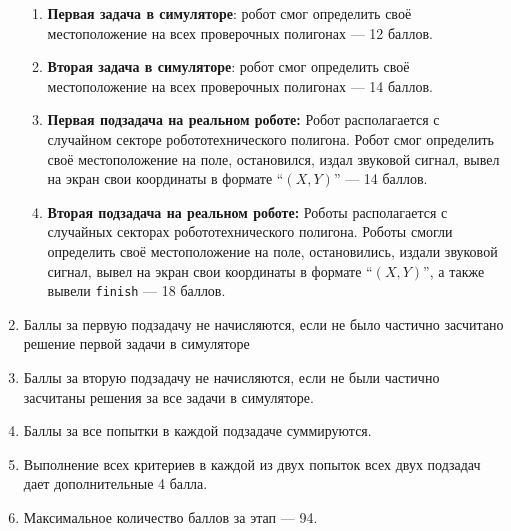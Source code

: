 \begin{enumerate}
        \begin{enumerate}
            \item \textbf{Первая задача в симуляторе}: робот смог определить своё местоположение на всех проверочных полигонах --- 12 баллов.
            \item \textbf{Вторая задача в симуляторе}: робот смог определить своё местоположение на всех проверочных полигонах --- 14 баллов.
            \item \textbf{Первая подзадача на реальном роботе:} Робот располагается с случайном секторе
            робототехнического полигона. Робот смог определить своё местоположение на поле, остановился,
            издал звуковой сигнал, вывел на экран свои координаты в формате ``$(X,Y)$'' --- 14 баллов.
            \item \textbf{Вторая подзадача на реальном роботе:} Роботы располагается с случайных секторах
                робототехнического полигона. Роботы смогли определить своё местоположение на поле, остановились,
                издали звуковой сигнал, вывел на экран свои координаты в формате ``$(X,Y)$'', а также вывели \texttt{finish} --- 18 баллов.
        \end{enumerate}
    \item Баллы за первую подзадачу не начисляются, если не было частично засчитано решение первой задачи в симуляторе
    \item Баллы за вторую подзадачу не начисляются, если не были частично засчитаны решения за все задачи в симуляторе.
    \item Баллы за все попытки в каждой подзадаче суммируются.
    \item Выполнение всех критериев в каждой из двух попыток всех двух подзадач дает дополнительные 4 балла.
    \item Максимальное количество баллов за этап --- 94.
\end{enumerate}